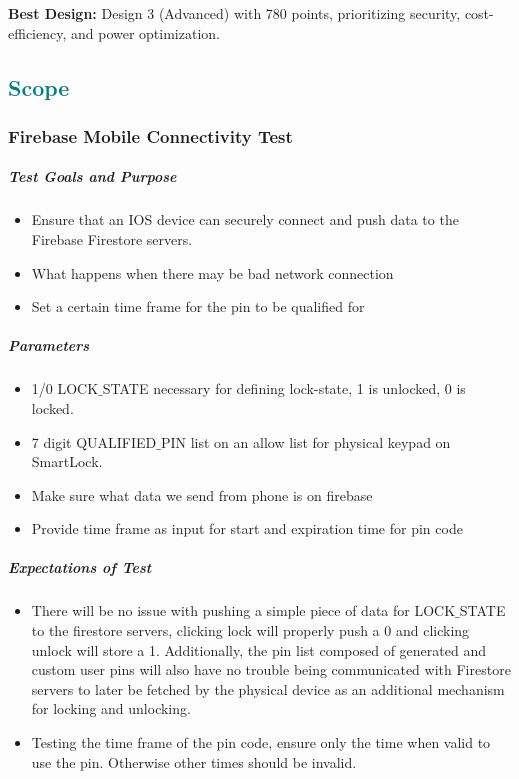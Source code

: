 \textbf{Best Design:} Design 3 (Advanced) with 780 points, prioritizing security, cost-efficiency, and power optimization.


\textcolor{teal}{\subsection{Scope}}
\subsubsection*{Firebase Mobile Connectivity Test}
\subparagraph{Test Goals and Purpose}
\begin{itemize}
    \item Ensure that an IOS device can securely connect and push data to the Firebase Firestore servers.
    \item What happens when there may be bad network connection
    \item Set a certain time frame for the pin to be qualified for
\end{itemize}

\subparagraph{Parameters}
\begin{itemize}
    \item 1/0 LOCK$\_$STATE necessary for defining lock-state, 1 is unlocked, 0 is locked.
    \item 7 digit QUALIFIED$\_$PIN list on an allow list for physical keypad on SmartLock.
    \item Make sure what data we send from phone is on firebase
    \item Provide time frame as input for start and expiration time for pin code
\end{itemize}

\subparagraph{Expectations of Test}
\begin{itemize}
    \item There will be no issue with pushing a simple piece of data for LOCK$\_$STATE to the firestore servers, clicking lock will properly push a 0 and clicking unlock will store a 1. Additionally, the pin list composed of generated and custom user pins will also have no trouble being communicated with Firestore servers to later be fetched by the physical device as an additional mechanism for locking and unlocking.
    \item Testing the time frame of the pin code, ensure only the time when valid to use the pin. Otherwise other times should be invalid.
\end{itemize}

